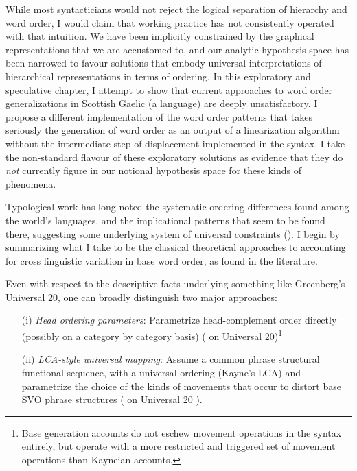 \documentclass[output=paper,colorlinks,citecolor=brown]{langscibook}
\begin{document}
While most syntacticians would not reject the logical separation of hierarchy and word order, I would claim that working practice has not consistently operated with that intuition. We have been implicitly constrained by the graphical representations that we are accustomed to, and our analytic hypothesis space has been narrowed to favour solutions that embody universal interpretations of hierarchical representations in terms of ordering. In this exploratory and speculative chapter, I attempt to show that current approaches to word order generalizations in Scottish Gaelic (a  language) are deeply unsatisfactory. I propose a different implementation of the word order patterns that takes seriously the generation of word order as an output of a linearization algorithm without the intermediate step of displacement implemented in the syntax. I take the non-standard flavour of these exploratory solutions as evidence that they do \textit{not} currently figure in our notional hypothesis space for these kinds of phenomena. 

Typological work has long noted the systematic ordering differences found among the world's languages, and the implicational patterns that seem to be found there, suggesting some underlying system of universal constraints (\citealt{greenberg66sug}). I begin by summarizing what I take to be the classical theoretical approaches to accounting for cross linguistic variation in base word order, as found in the  literature. 

Even with respect to the descriptive facts underlying something like Greenberg's Universal 20, one can broadly distinguish two  major approaches:

 
\begin{itemize}
\item[(i)] \textit{Head ordering parameters}: {Parametrize head-complement order directly (possibly on a category by category basis)} (\citealt{haider00ovmb, abelsneeleman12} on Universal 20)\footnote{Base generation accounts do not eschew movement operations in the syntax entirely, but operate with a more restricted and triggered set of movement operations than Kayneian accounts.}
\item[(ii)]\textit{LCA-style universal mapping}: {Assume a common phrase structural functional sequence, with a universal ordering (Kayne's LCA) and para\-met\-rize the choice of the kinds of movements that occur to distort base SVO phrase structures} (\citealt{kayne94as, koopmanszabolcsi00, cinque04} on Universal 20 ). 
\end{itemize}
\end{document}
